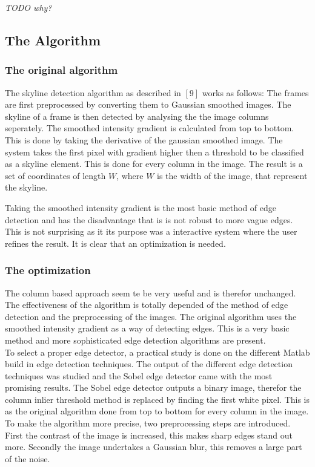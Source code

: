 \documentclass[10pt]{article}
\begin{document}

\textit{TODO why?}
 \subsection{The Algorithm}
 \subsubsection{The original algorithm}
The skyline detection algorithm as described in $[9]$ works as follows:
The frames are first preprocessed by converting them to Gaussian smoothed images.
The skyline of a frame is then detected by analysing the the image columns
seperately.
The smoothed intensity gradient is calculated from top to bottom. This is done
by taking the derivative of the gaussian smoothed image.
The system takes the first pixel with gradient higher then a threshold to be
classified as a skyline element.  This is done for every column in the image.
The result is a set of coordinates of length $W$,
where $W$ is the width of the image, that represent the skyline.

Taking the smoothed intensity gradient is the most basic method of edge
detection and has the disadvantage that is is not robust to more vague
edges. This is not surprising as it its purpose was a interactive system where the
user refines the result. It is clear that an optimization is needed.

  \subsubsection{The optimization}
The column based approach seem te be very useful and is therefor unchanged. 
The effectiveness of the algorithm is totally depended of the method of edge
detection and the preprocessing of the images. 
The original algorithm uses the smoothed intensity gradient as a way of
detecting edges. This is a very basic method and more sophisticated edge
detection algorithms are present.\\
To select a proper edge detector, a practical study is done on the different
Matlab build in edge detection techniques. The output of the different edge
detection techniques was studied and the Sobel edge detector came with the most
promising results. The Sobel edge detector outputs a binary image, therefor the column inlier
threshold method is replaced by finding the first white pixel. This is as the
original algorithm done from top to bottom for every column in the image.
\\ 
To make the algorithm more precise, two preprocessing
steps are introduced. First the contrast of the image is increased, this makes
sharp edges stand out more.  Secondly the image undertakes a Gaussian blur,
this removes a large part of the noise.
\end{document}
